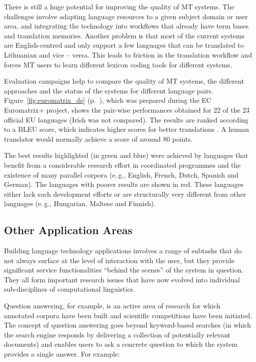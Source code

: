 \begin{multicols}{2}
There is still a huge potential for improving the quality of MT systems. The challenges involve adapting language resources to a given subject domain or user area, and integrating the technology into workflows that already have term bases and translation memories. Another problem is that most of the current systems are English-centred and only support a few languages that can be translated to Lithuanian and vice -- versa. This leads to friction in the translation workflow and forces MT users to learn different lexicon coding tools for different systems.

Evaluation campaigns help to compare the quality of MT systems, the different approaches and the status of the systems for different language pairs. Figure~\ref{fig:euromatrix_de} (p.~\pageref{fig:euromatrix_de}), which was prepared during the EC Euromatrix+ project, shows the pair-wise performances obtained for 22 of the 23 official EU languages (Irish was not compared). The results are ranked according to a BLEU score, which indicates higher scores for better translations \cite{bleu1}. A human translator would normally achieve a score of around 80 points.

The best results highlighted (in green and blue) were achieved by languages that benefit from a considerable research effort in coordinated programmes and the existence of many parallel corpora (e.\,g., English, French, Dutch, Spanish and German). The languages with poorer results are shown in red. These languages either lack such development efforts or are structurally very different from other languages (e.\,g., Hungarian, Maltese and Finnish).


\subsection{Other Application Areas}

Building language technology applications involves a range of subtasks that do not always surface at the level of interaction with the user, but they provide significant service functionalities “behind the scenes” of the system in question. They all form important research issues that have now evolved into individual sub-disciplines of computational linguistics. 


 Question answering, for example, is an active area of research for which annotated corpora have been built and scientific competitions have been initiated. The concept of question answering goes beyond keyword-based searches (in which the search engine responds by delivering a collection of potentially relevant documents) and enables users to ask a concrete question to which the system provides a single answer. For example:


\end{multicols}
